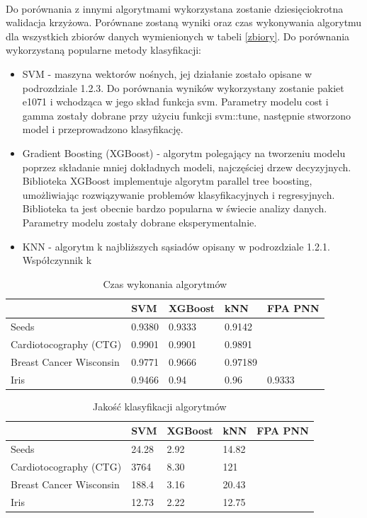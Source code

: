 \documentclass[a4paper,12pt,twoside]{article}
\begin{document}
\paragraph{}
Do porównania z innymi algorytmami wykorzystana zostanie dziesięciokrotna walidacja krzyżowa. Porównane zostaną wyniki oraz czas wykonywania algorytmu dla wszystkich zbiorów danych wymienionych w tabeli \ref{zbiory}. Do porównania wykorzystaną popularne metody klasyfikacji:
\begin{itemize}
\item SVM - maszyna wektorów nośnych, jej działanie zostało opisane w podrozdziale 1.2.3.  Do porównania wyników wykorzystany zostanie pakiet  e1071 i wchodząca w jego skład funkcja svm. Parametry modelu cost i gamma zostały dobrane przy użyciu funkcji svm::tune, następnie stworzono model i przeprowadzono klasyfikację. 
\item Gradient Boosting (XGBoost) - algorytm polegający na tworzeniu modelu poprzez składanie mniej dokładnych modeli, najczęściej drzew decyzyjnych. Biblioteka XGBoost implementuje algorytm parallel tree boosting, umożliwiając rozwiązywanie problemów klasyfikacyjnych i regresyjnych. Biblioteka ta jest obecnie bardzo popularna w świecie analizy danych. Parametry modelu zostały dobrane eksperymentalnie. 
\item KNN - algorytm k najbliższych sąsiadów opisany w podrozdziale 1.2.1. Współczynnik k  
\end{itemize}

\begin{table}[H]
\centering
\caption{Czas wykonania algorytmów}
\label{plugvsfpa3}
\begin{tabular}{|l|l|l|l|l|}
\hline
          & SVM & XGBoost & kNN &FPA PNN\\ \hline
Seeds   &  0.9380 & 0.9333 & 0.9142 &\\ \hline
Cardiotocography (CTG)   & 0.9901 & 0.9901 & 0.9891 & \\ \hline
Breast Cancer Wisconsin  &0.9771 & 0.9666 & 0.97189 &\\ \hline
Iris  & 0.9466 & 0.94 & 0.96 & 0.9333\\ \hline
\end{tabular}
\end{table}


\begin{table}[H]
\centering
\caption{Jakość klasyfikacji algorytmów}
\label{plugvsfpa3}
\begin{tabular}{|l|l|l|l|l|}
\hline
          & SVM & XGBoost & kNN &FPA PNN\\ \hline
Seeds   &  24.28 & 2.92 & 14.82 &\\ \hline
Cardiotocography (CTG)   & 3764 & 8.30 & 121 & \\ \hline
Breast Cancer Wisconsin  &188.4 &  3.16  & 20.43 &\\ \hline
Iris  & 12.73  & 2.22 & 12.75 &\\ \hline
\end{tabular}
\end{table}
\newpage
\thispagestyle{empty}
\mbox{}
\end{document}

